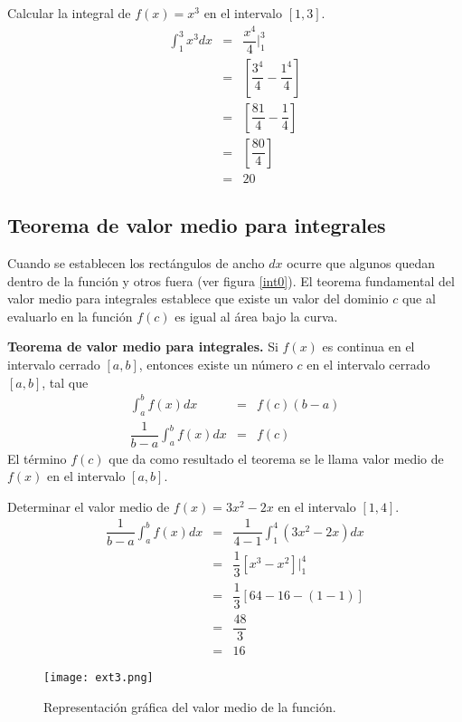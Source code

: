\begin{myexample}
Calcular la integral de $f(x)=x^{3}$ en el intervalo $[1,3]$.
\begin{eqnarray*}
\int_{1}^{3}x^{3}dx&=&\dfrac{x^{4}}{4}\Bigg|_{1}^{3}\\
&=&\left[\dfrac{3^{4}}{4}-\dfrac{1^{4}}{4} \right]\\
&=&\left[\dfrac{81}{4}-\dfrac{1}{4} \right]\\
&=&\left[\dfrac{80}{4} \right]\\
&=& 20
\end{eqnarray*}
\end{myexample}

\subsection{Teorema de valor medio para integrales}

Cuando se establecen los rectángulos de ancho $dx$ ocurre que algunos quedan dentro de la función y otros fuera (ver figura \ref{int0}). El teorema fundamental del valor medio para integrales establece que existe un valor del dominio $c$ que al evaluarlo en la función $f(c)$ es igual al área bajo la curva. 
\begin{mydef}
\textbf{Teorema de valor medio para integrales. }Si $f(x)$ es continua en el intervalo cerrado $[a,b]$, entonces existe un número $c$ en el intervalo cerrado $[a,b]$, tal que 
\begin{eqnarray}
\int_{a}^{b}f(x)dx&=&f(c)(b-a)\\
\dfrac{1}{b-a}\int_{a}^{b}f(x)dx&=&f(c)
\end{eqnarray}
El término $f(c)$ que da como resultado el teorema se le llama valor medio de $f(x)$ en el intervalo $[a,b]$.
\end{mydef}

\begin{myexample}
Determinar el valor medio de $f(x)=3x^{2}-2x$ en el intervalo $[1,4]$.
\begin{eqnarray*}
\dfrac{1}{b-a}\int_{a}^{b}f(x)dx&=&\dfrac{1}{4-1}\int_{1}^{4}(3x^{2}-2x)dx \\
&=& \dfrac{1}{3}\left[x^{3}-x^{2} \right]\Bigg|_{1}^{4}\\
&=&\dfrac{1}{3}\left[64-16-(1-1) \right]\\
&=&\dfrac{48}{3}\\
&=&16
\end{eqnarray*}
\begin{center}
\begin{figure}[h!]
\centering
\texttt{[image: ext3.png]}
\caption{Representación gráfica del valor medio de la función.} \label{ext3}
\end{figure}
\end{center}
\end{myexample}